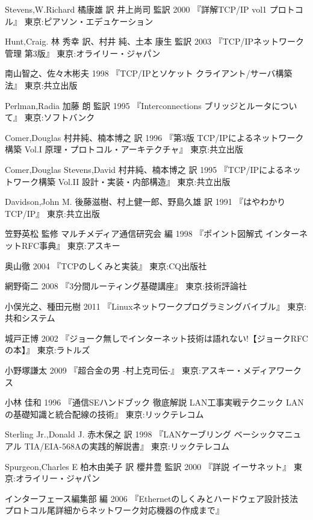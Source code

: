 \begin{thebibliography}{99}
\item
	Stevens,W.Richard
	橘康雄 訳 井上尚司 監訳
	2000
	『詳解TCP/IP vol1 プロトコル』
	東京:ピアソン・エデュケーション
\item
    Hunt,Craig.
	林 秀幸 訳、村井 純、土本 康生 監訳
	2003
	『TCP/IPネットワーク管理 第3版』
	東京:オライリー・ジャパン
\item	
	南山智之、佐々木彬夫
	1998
	『TCP/IPとソケット クライアント/サーバ構築法』
	東京:共立出版
\item
	Perlman,Radia
	加藤 朗 監訳
	1995
	『Interconnections ブリッジとルータについて』
	東京:ソフトバンク
\item
	Comer,Douglas
	村井純、楠本博之 訳
	1996
	『第3版 TCP/IPによるネットワーク構築 Vol.I 原理・プロトコル・アーキテクチャ』
	東京:共立出版
\item
	Comer,Douglas Stevens,David
	村井純、楠本博之 訳
	1995
	『TCP/IPによるネットワーク構築 Vol.II 設計・実装・内部構造』
	東京:共立出版
\item
	Davidson,John M.
	後藤滋樹、村上健一郎、野島久雄 訳
	1991
	『はやわかりTCP/IP』
	東京:共立出版
\item
	笠野英松 監修
	マルチメディア通信研究会 編
	1998
	『ポイント図解式 インターネットRFC事典』
	東京:アスキー
\item
	奥山徹
	2004
	『TCPのしくみと実装』
	東京:CQ出版社
\item
	網野衛二
	2008
	『3分間ルーティング基礎講座』
	東京:技術評論社
\item
	小俣光之、種田元樹
	2011
	『Linuxネットワークプログラミングバイブル』
	東京:共和システム
\item
	城戸正博
	2002
	『ジョーク無しでインターネット技術は語れない!【ジョークRFCの本】』
	東京:ラトルズ
\item	
	小野塚謙太
	2009
	『超合金の男 -村上克司伝-』
	東京:アスキー・メディアワークス
\item
	小林 佳和
	1996
	『通信SEハンドブック 徹底解説 LAN工事実戦テクニック LANの基礎知識と統合配線の技術』
	東京:リックテレコム
\item
     Sterling Jr.,Donald J.
	赤木保之 訳
	1998
	『LANケーブリング ベーシックマニュアル TIA/EIA-568Aの実践的解説書』
	東京:リックテレコム
\item
     Spurgeon,Charles E
	柏木由美子 訳
	櫻井豊 監訳
	2000
	『詳説 イーサネット』
	東京:オライリー・ジャパン
\item
    インターフェース編集部 編
    2006
    『Ethernetのしくみとハードウェア設計技法 プロトコル尾詳細からネットワーク対応機器の作成まで』

\end{thebibliography}
